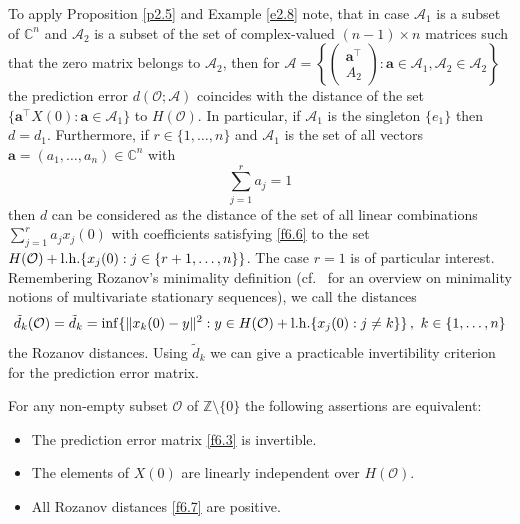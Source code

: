\documentclass{amsart}
\begin{document}
To apply Proposition \ref{p2.5} and Example \ref{e2.8} note, that in case ${\mathcal A}_1$ is a subset of ${\mathbb C}^n$ and ${\mathcal A}_2$ is a subset of the set of complex-valued $(n-1) \times n$ matrices such that the zero matrix belongs to ${\mathcal A}_2$, then for ${\mathcal A} = \left\{ \left( \begin{array}{c} {\mathbf a}^\top \\ A_2 \end{array} \right) : {\mathbf a} \in {\mathcal A}_1, {\mathcal A}_2 \in {\mathcal A}_2 \right\}$ the prediction error $d({\mathcal O} ; {\mathcal A})$ coincides with the distance of the set $\{ {\mathbf a}^\top X(0) : {\mathbf a} \in {\mathcal A}_1 \}$ to $H({\mathcal O})$. In particular, if ${\mathcal A}_1$ is the singleton $\{ e_1 \}$ then $d=d_1$. Furthermore, if $r \in \{ 1,\ldots,n \}$ and ${\mathcal A}_1$ is the set of all vectors ${\mathbf a} = (a_1 ,\ldots, a_n ) \in {\mathbb C}^n$ with
\begin{equation}   \label{f6.6}
     \sum_{j=1}^r a_j = 1
\end{equation}
then $d$ can be considered as the distance of the set of all linear combinations $\sum_{j=1}^r a_j x_j(0)$ with coefficients satisfying \eqref{f6.6} to the set $H({\mathcal O}) + {\rm l.h.} \{ x_j(0) : j \in \{ r+1,\ldots,n \}\}$. The case $r=1$ is of particular interest. Remembering Rozanov's minimality definition \cite{MMS} (cf.~\cite{KMae} for an overview on minimality notions of multivariate stationary sequences), we call the distances
\begin{equation}   \label{f6.7}
    \tilde{d}_k({\mathcal O}) = \tilde{d}_k = \inf \{ \| x_k(0)-y \|^2 : y \in H({\mathcal O}) + {\rm l.h.} \{ x_j(0) : j \not=k \}\} \, , \,\, k \in \{ 1,\ldots,n\}
\end{equation}
the Rozanov distances. Using $\tilde{d}_k$ we can give a practicable invertibility criterion for the prediction error matrix. 

\begin{pro}   \label{p6.2}
   For any non-empty subset $\mathcal O$ of ${\mathbb Z} \setminus \{ 0 \}$ the following assertions are equivalent:
   \begin{itemize}
      \item[(i)] The prediction error matrix \eqref{f6.3} is invertible.
      \item[(ii)] The elements of $X(0)$ are linearly independent over $H({\mathcal O})$. 
      \item[(iii)] All Rozanov distances \eqref{f6.7} are positive.
   \end{itemize}
\end{pro}
\end{document}
